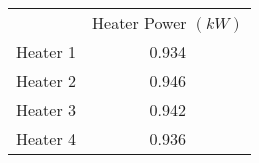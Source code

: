 \begin{tabular}{cc}
\hline
& Heater Power $\left(kW\right)$ \\
Heater 1 & 0.934 \\
Heater 2 & 0.946 \\
Heater 3 & 0.942 \\
Heater 4 & 0.936 \\
\hline
\end{tabular}
